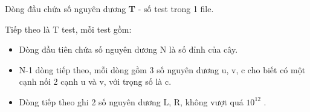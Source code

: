 Dòng đầu chứa số nguyên dương   \textbf{    T   }   - số test trong 1 file.  

   Tiếp theo là T test, mỗi test gồm:  
\begin{itemize}
	\item     Dòng đầu tiên chứa số nguyên dương N là số đỉnh của cây.   
	\item     N-1 dòng tiếp theo, mỗi dòng gồm 3 số nguyên dương u, v, c cho biết có một cạnh nối 2 cạnh u và v, với trọng số là c.   
	\item     Dòng tiếp theo ghi 2 số nguyên dương L, R, không vượt quá $10^{12}$    .   
\end{itemize}